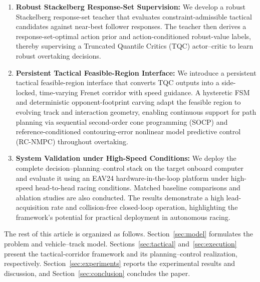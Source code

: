 \documentclass[sensors,article,submit,moreauthors]{Definitions/mdpi}
\begin{document}
\begin{enumerate}

\item \textbf{Robust Stackelberg Response-Set Supervision:}
We develop a robust Stackelberg response-set teacher that evaluates constraint-admissible tactical candidates against near-best follower responses. The teacher then derives a response-set-optimal action prior and action-conditioned robust-value labels, thereby supervising a Truncated Quantile Critics (TQC) actor--critic to learn robust overtaking decisions.

\item \textbf{Persistent Tactical Feasible-Region Interface:}
We introduce a persistent tactical feasible-region interface that converts TQC outputs into a side-locked, time-varying Frenet corridor with speed guidance. 
A hysteretic FSM and deterministic opponent-footprint carving adapt the feasible region to evolving track and interaction geometry, enabling continuous support for path planning via sequential second-order cone programming (SOCP) and reference-conditioned contouring-error nonlinear model predictive control (RC-NMPC) throughout overtaking.


\item \textbf{System Validation under High-Speed Conditions:}
We deploy the complete decision--planning--control stack on the target onboard computer and evaluate it using an EAV24 hardware-in-the-loop platform under high-speed head-to-head racing conditions. Matched baseline comparisons and ablation studies are also conducted. The results demonstrate a high lead-acquisition rate and collision-free closed-loop operation, highlighting the framework's potential for practical deployment in autonomous racing.

\end{enumerate}


The rest of this article is organized as follows.
Section~\ref{sec:model}
formulates the problem and vehicle--track model. Sections~\ref{sec:tactical}
and~\ref{sec:execution} present the tactical-corridor framework and its
planning--control realization, respectively. Section~\ref{sec:experiments}
reports the experimental results and discussion, and
Section~\ref{sec:conclusion} concludes the paper.

\begingroup
\setlength{\abovedisplayskip}{6pt plus 1pt minus 1pt}
\setlength{\belowdisplayskip}{6pt plus 1pt minus 1pt}
\setlength{\abovedisplayshortskip}{4pt plus 1pt minus 1pt}
\setlength{\belowdisplayshortskip}{4pt plus 1pt minus 1pt}
\setlength{\jot}{2pt}
\end{document}
